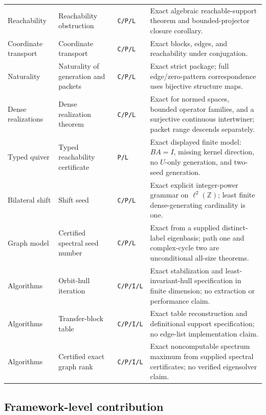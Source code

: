 \documentclass[11pt]{article}
\theoremstyle{definition}
\theoremstyle{remark}
\newcommand{\Z}{\mathbb Z}
\begin{document}
\begin{longtable}{L{0.16\textwidth}L{0.25\textwidth}L{0.10\textwidth}L{0.38\textwidth}}
Reachability & Reachability obstruction & \texttt{C/P/L} & Exact algebraic reachable-support theorem and bounded-projector closure corollary. \\
Coordinate transport & Coordinate transport & \texttt{C/P/L} & Exact blocks, edges, and reachability under conjugation. \\
Naturality & Naturality of generation and packets & \texttt{C/P/L} & Exact strict package; full edge/zero-pattern correspondence uses bijective structure maps. \\
Dense realizations & Dense realization theorem & \texttt{C/P/L} & Exact for normed spaces, bounded operator families, and a surjective continuous intertwiner; packet range descends separately. \\
Typed quiver & Typed reachability certificate & \texttt{P/L} & Exact displayed finite model: $BA=I$, missing kernel direction, no $U$-only generation, and two-seed generation. \\
Bilateral shift & Shift seed & \texttt{C/P/L} & Exact explicit integer-power grammar on $\ell^2(\Z)$; least finite dense-generating cardinality is one. \\
Graph model & Certified spectral seed number & \texttt{C/P/L} & Exact from a supplied distinct-label eigenbasis; path one and complex-cycle two are unconditional all-size theorems. \\
Algorithms & Orbit-hull iteration & \texttt{C/P/I/L} & Exact stabilization and least-invariant-hull specification in finite dimension; no extraction or performance claim. \\
Algorithms & Transfer-block table & \texttt{C/P/I/L} & Exact table reconstruction and definitional support specification; no edge-list implementation claim. \\
Algorithms & Certified exact graph rank & \texttt{C/P/I/L} & Exact noncomputable spectrum maximum from supplied spectral certificates; no verified eigensolver claim. \\
\bottomrule
\end{longtable}
\endgroup

\subsection{Framework-level contribution}
\end{document}
